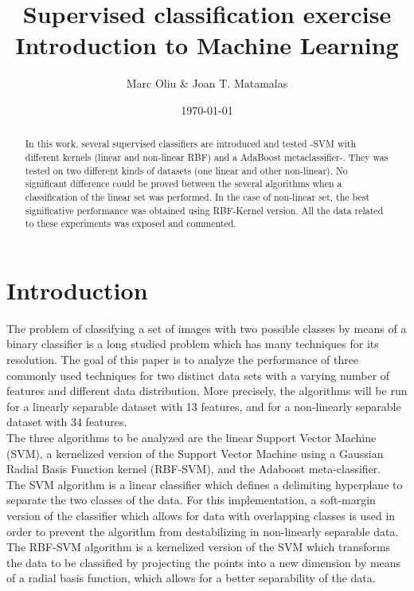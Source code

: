 \documentclass[10pt, journal]{IEEEtran}
\title{Supervised classification exercise\\Introduction to Machine Learning}
\author{Marc Oliu \& Joan T. Matamalas}
\date{\today}
\begin{document}
\ifpdf
{}
\else
{}
\fi

\maketitle

\begin{abstract}
In this work, several supervised classifiers are introduced and tested -SVM with different kernels (linear and non-linear RBF) and a AdaBoost metaclassifier-. They was tested on two different kinds of datasets (one linear and other non-linear). No significant difference could be proved between the several algorithms when a classification of the linear set was performed. In the case of non-linear set, the best significative performance was obtained using RBF-Kernel version. All the data related to these experiments was exposed and commented.
\end{abstract}

\section{Introduction} %
\label{sec:introduction}
The problem of classifying a set of images with two possible classes by means of a binary classifier is a long studied problem which has many techniques for its resolution. The goal of this paper is to analyze the performance of three commonly used techniques for two distinct data sets with a varying number of features and different data distribution. More precisely, the algorithms will be run for a linearly separable dataset with 13 features, and for a non-linearly separable dataset with 34 features.\\

The three algorithms to be analyzed are the linear Support Vector Machine (SVM), a kernelized version of the Support Vector Machine using a Gaussian Radial Basis Function kernel (RBF-SVM), and the Adaboost meta-classifier.\\

The SVM algorithm is a linear classifier which defines a delimiting hyperplane to separate the two classes of the data. For this implementation, a soft-margin version of the classifier which allows for data with overlapping classes is used in order to prevent the algorithm from destabilizing in non-linearly separable data. The RBF-SVM algorithm is a kernelized version of the SVM which transforms the data to be classified by projecting the points into a new dimension by means of a radial basis function, which allows for a better separability of the data.\\
\end{document}
